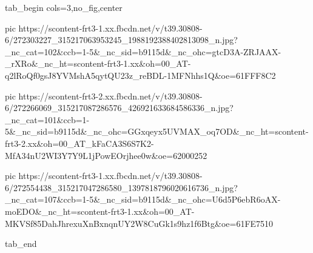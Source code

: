  
 
 
 
 


\ifcmt
  tab_begin cols=3,no_fig,center

     pic https://scontent-frt3-1.xx.fbcdn.net/v/t39.30808-6/272303227_315217063953245_1988192388402813098_n.jpg?_nc_cat=102&ccb=1-5&_nc_sid=b9115d&_nc_ohc=gtcD3A-ZRJAAX-_rXRo&_nc_ht=scontent-frt3-1.xx&oh=00_AT-q2lRoQf0gsJ8YVMshA5qytQU23z_reBDL-1MFNhhs1Q&oe=61FFF8C2

     pic https://scontent-frt3-2.xx.fbcdn.net/v/t39.30808-6/272266069_315217087286576_426921633684586336_n.jpg?_nc_cat=101&ccb=1-5&_nc_sid=b9115d&_nc_ohc=GGxqeyx5UVMAX_oq7OD&_nc_ht=scontent-frt3-2.xx&oh=00_AT_kFaCA3S6S7K2-MfA34nU2WI3Y7Y9L1jPowEOrjhee0w&oe=62000252

     pic https://scontent-frt3-1.xx.fbcdn.net/v/t39.30808-6/272554438_315217047286580_1397818796020616736_n.jpg?_nc_cat=107&ccb=1-5&_nc_sid=b9115d&_nc_ohc=U6d5P6ebR6oAX-moEDO&_nc_ht=scontent-frt3-1.xx&oh=00_AT-MKVSf85DahJhrexuXnBxnqnUY2W8CuGk1s9hz1f6Btg&oe=61FE7510

  tab_end
\fi
